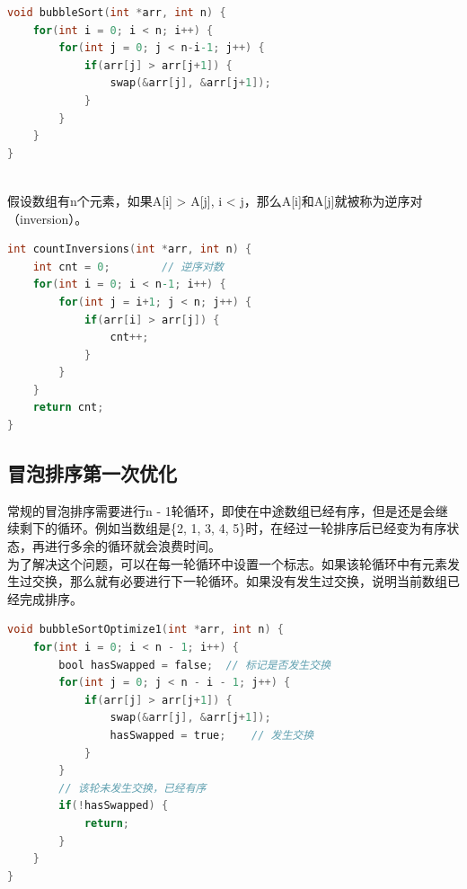 
\begin{lstlisting}[language=C]
void bubbleSort(int *arr, int n) {
    for(int i = 0; i < n; i++) {
        for(int j = 0; j < n-i-1; j++) {
            if(arr[j] > arr[j+1]) {
                swap(&arr[j], &arr[j+1]);
            }
        }
    }
}
\end{lstlisting}

\vspace{0.5cm}

\\

假设数组有n个元素，如果A[i] > A[j], i < j，那么A[i]和A[j]就被称为逆序对（inversion）。

\begin{lstlisting}[language=C]
int countInversions(int *arr, int n) {
    int cnt = 0;        // 逆序对数
    for(int i = 0; i < n-1; i++) {
        for(int j = i+1; j < n; j++) {
            if(arr[i] > arr[j]) {
                cnt++;
            }
        }
    }
    return cnt;
}
\end{lstlisting}

\vspace{0.5cm}

\subsection{冒泡排序第一次优化}

常规的冒泡排序需要进行n - 1轮循环，即使在中途数组已经有序，但是还是会继续剩下的循环。例如当数组是\{2, 1, 3, 4, 5\}时，在经过一轮排序后已经变为有序状态，再进行多余的循环就会浪费时间。\\

为了解决这个问题，可以在每一轮循环中设置一个标志。如果该轮循环中有元素发生过交换，那么就有必要进行下一轮循环。如果没有发生过交换，说明当前数组已经完成排序。\\


\begin{lstlisting}[language=C]
void bubbleSortOptimize1(int *arr, int n) {
    for(int i = 0; i < n - 1; i++) {
        bool hasSwapped = false;  // 标记是否发生交换
        for(int j = 0; j < n - i - 1; j++) {
            if(arr[j] > arr[j+1]) {
                swap(&arr[j], &arr[j+1]);
                hasSwapped = true;    // 发生交换
            }
        }
        // 该轮未发生交换，已经有序
        if(!hasSwapped) {
            return;
        }
    }
}
\end{lstlisting}

